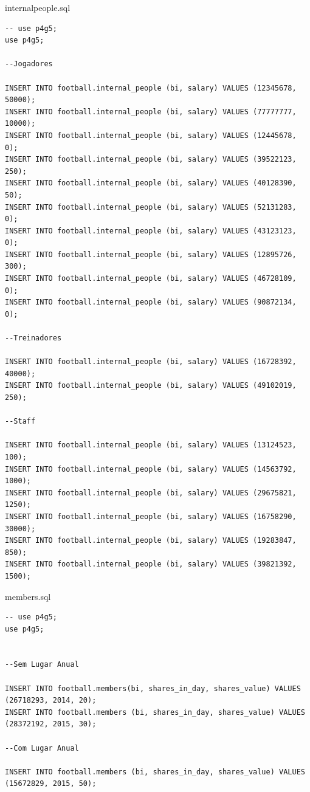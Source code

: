 \documentclass[pdftex,12pt,a4paper]{report}
\begin{document}
internal{\textunderscore}people.sql
\begin{lstlisting} 
-- use p4g5;
use p4g5;

--Jogadores

INSERT INTO football.internal_people (bi, salary) VALUES (12345678, 50000);
INSERT INTO football.internal_people (bi, salary) VALUES (77777777, 10000);
INSERT INTO football.internal_people (bi, salary) VALUES (12445678, 0);
INSERT INTO football.internal_people (bi, salary) VALUES (39522123, 250);
INSERT INTO football.internal_people (bi, salary) VALUES (40128390, 50);
INSERT INTO football.internal_people (bi, salary) VALUES (52131283, 0);
INSERT INTO football.internal_people (bi, salary) VALUES (43123123, 0);
INSERT INTO football.internal_people (bi, salary) VALUES (12895726, 300);
INSERT INTO football.internal_people (bi, salary) VALUES (46728109, 0);
INSERT INTO football.internal_people (bi, salary) VALUES (90872134, 0);

--Treinadores

INSERT INTO football.internal_people (bi, salary) VALUES (16728392, 40000);
INSERT INTO football.internal_people (bi, salary) VALUES (49102019, 250);

--Staff

INSERT INTO football.internal_people (bi, salary) VALUES (13124523, 100);
INSERT INTO football.internal_people (bi, salary) VALUES (14563792, 1000);
INSERT INTO football.internal_people (bi, salary) VALUES (29675821, 1250);
INSERT INTO football.internal_people (bi, salary) VALUES (16758290, 30000);
INSERT INTO football.internal_people (bi, salary) VALUES (19283847, 850);
INSERT INTO football.internal_people (bi, salary) VALUES (39821392, 1500);

\end{lstlisting}

members.sql
\begin{lstlisting} 
-- use p4g5;
use p4g5;


--Sem Lugar Anual

INSERT INTO football.members(bi, shares_in_day, shares_value) VALUES (26718293, 2014, 20);
INSERT INTO football.members (bi, shares_in_day, shares_value) VALUES (28372192, 2015, 30);

--Com Lugar Anual

INSERT INTO football.members (bi, shares_in_day, shares_value) VALUES (15672829, 2015, 50);

\end{lstlisting}
\end{document}

